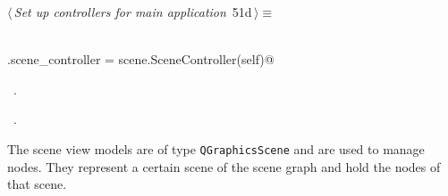 \documentclass[
    a4paper,      %
    10pt,         %
    openright,    %
    notitlepage,  %
    parskip=half, %
]{scrreprt}       %
\theoremstyle{definition}                    %
\begin{document}
\begin{flushleft} \small
\begin{minipage}{\linewidth}\label{scrap79}\raggedright\small
{} $\langle\,${\itshape Set up controllers for main application}\nobreak\ {\footnotesize {51d}}$\,\rangle\equiv$
\vspace{-1exm}
\begin{list}{}{} \item
\mbox{}\lstinline@@\\
\mbox{}\lstinline@self.scene_controller = scene.SceneController(self)@{\NWsep}
\end{list}
\vspace{-1.5ex}
\footnotesize
\begin{list}{}{\setlength{\itemsep}{-\parsep}\setlength{\itemindent}{-\leftmargin}}
\item \NWtxtMacroDefBy\ .
\item \NWtxtMacroRefIn\ .

\item{}
\end{list}
\end{minipage}\vspace{4ex}
\end{flushleft}
The scene view models are of type \verb+QGraphicsScene+ and are used to manage
nodes. They represent a certain scene of the scene graph and hold the nodes of
that scene.
\end{document}
